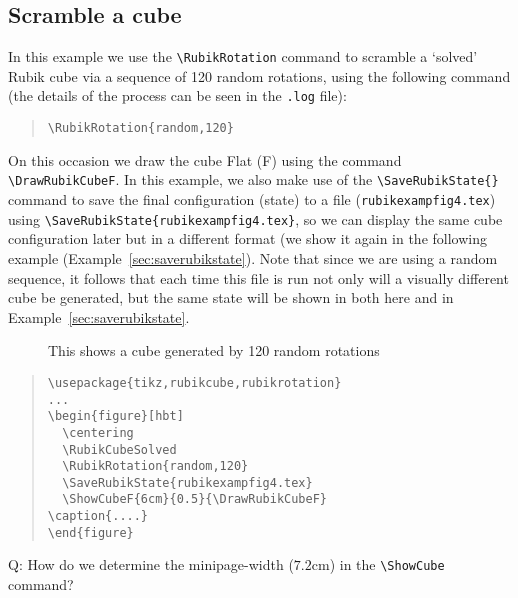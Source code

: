 \documentclass[a4paper]{article}
\begin{document}
\pagebreak

\subsection{Scramble a cube}
\label{sec:scrambleacube}


In this example we use the \verb!\RubikRotation! command to scramble a `solved' 
Rubik cube via  a sequence of 120 random rotations, using the following  command 
(the details of the process can be seen in the \texttt{.log} file):
\begin{quote}
\begin{verbatim}
\RubikRotation{random,120}
\end{verbatim}
\end{quote}
On this occasion we draw the cube Flat (F) using the command \verb!\DrawRubikCubeF!.
In this example, we also make use of the \verb!\SaveRubikState{}! command to  save 
the final  configuration (state) to a file (\texttt{rubikexampfig4.tex}) using 
\verb!\SaveRubikState{rubikexampfig4.tex}!,
so we can  display the  same cube configuration later  but in  a different format
(we show it again in the following example (Example~\ref{sec:saverubikstate}).
Note that since we are using a random sequence, it follows that each 
time this file is run not only will a visually different  cube  be generated,  
but the same state  will be shown in both 
here and in Example~\ref{sec:saverubikstate}.
\begin{figure}[hbt]
  \centering
  \RubikCubeSolved
\parbox{0.7\textwidth}{%
\caption{\label{fig:randomone}This shows a cube  generated by 120 random rotations}}
\end{figure}
\begin{quote}
\begin{verbatim}
\usepackage{tikz,rubikcube,rubikrotation}
...
\begin{figure}[hbt]
  \centering
  \RubikCubeSolved
  \RubikRotation{random,120}
  \SaveRubikState{rubikexampfig4.tex}  
  \ShowCubeF{6cm}{0.5}{\DrawRubikCubeF}
\caption{....}
\end{figure}
\end{verbatim}
\end{quote}

{\noindent}Q: How do we determine the minipage-width ($7.2$cm) in the 
\verb!\ShowCube! command?
\end{document}
